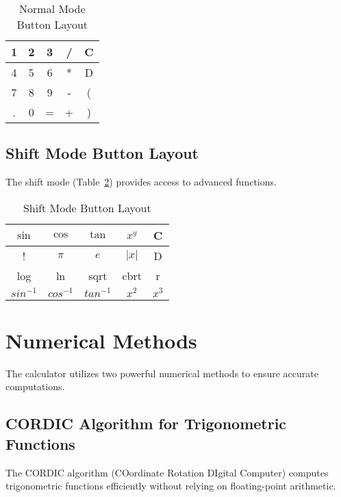 \documentclass[a4paper,12pt]{article}
\begin{document}
\begin{table}[H]
    \centering
    \renewcommand{\arraystretch}{1.2}
    \begin{tabular}{|c|c|c|c|c|}
        \hline
        1 & 2 & 3 & / & C \\
        \hline
        4 & 5 & 6 & * & D \\
        \hline
        7 & 8 & 9 & - & ( \\
        \hline
        . & 0 & = & + & ) \\
        \hline
    \end{tabular}
    \caption{Normal Mode Button Layout}
    \label{tab:normal}
\end{table}

\subsection{Shift Mode Button Layout}
The shift mode (Table~\ref{tab:shift}) provides access to advanced functions.

\begin{table}[H]
    \centering
    \renewcommand{\arraystretch}{1.2}
    \begin{tabular}{|c|c|c|c|c|}
        \hline
        $\sin$ & $\cos$ & $\tan$ & $x^y$ & C \\
        \hline
        ! & $\pi$ & $e$ & $|x|$ & D \\
        \hline
        log & ln & sqrt & cbrt & r \\
        \hline
        $sin^{-1}$ & $cos^{-1}$ & $tan^{-1}$ & $x^2$ & $x^3$ \\
        \hline
    \end{tabular}
    \caption{Shift Mode Button Layout}
    \label{tab:shift}
\end{table}

\newpage

\section{Numerical Methods}
The calculator utilizes two powerful numerical methods to ensure accurate computations.

\subsection{CORDIC Algorithm for Trigonometric Functions}
The CORDIC algorithm (COordinate Rotation DIgital Computer) computes trigonometric functions efficiently without relying on floating-point arithmetic.
\end{document}
